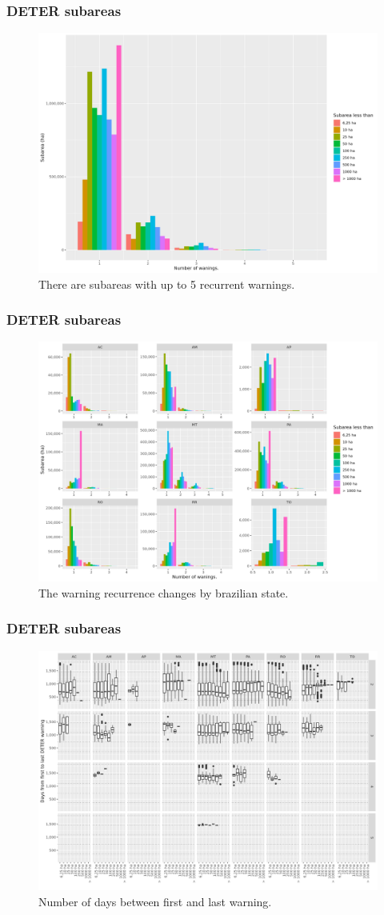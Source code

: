 \documentclass[aspectratio=169]{beamer}
\begin{document}
\begin{frame}
    \frametitle{DETER subareas}
    \begin{figure}[h] 
        \includegraphics[width=0.65\linewidth]
        {./figures/plot_deter_subarea_by_nwarnings.png}
        \caption{There are subareas with up to 5 recurrent warnings.}
        \label{fig:deter_subareas_nwarnings}
    \end{figure}
\end{frame}

\begin{frame}
    \frametitle{DETER subareas}
    \begin{figure}[h] 
        \includegraphics[width=0.65\linewidth]
        {./figures/plot_deter_subarea_by_warnings_state.png}
        \caption{The warning recurrence changes by brazilian state.}
        \label{fig:deter_subarea_warnings_state}
    \end{figure}
\end{frame}

\begin{frame}
    \frametitle{DETER subareas}
    \begin{figure}[h] 
        \includegraphics[width=0.65\linewidth]
        {./figures/plot_deter_days_first_to_last.png}
        \caption{Number of days between first and last warning.}
        \label{fig:deter_days_first_to_last}
    \end{figure}
\end{frame}
\end{document}
